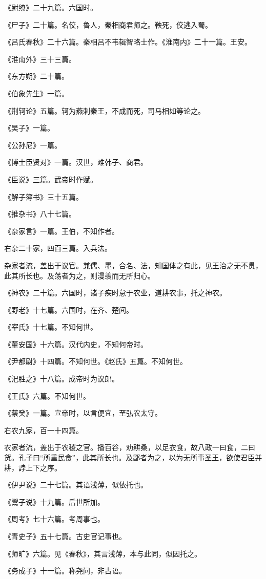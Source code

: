 \documentclass[]{article}
\begin{document}
《尉缭》二十九篇。六国时。

《尸子》二十篇。名佼，鲁人，秦相商君师之。鞅死，佼逃入蜀。

《吕氏春秋》二十六篇。秦相吕不韦辑智略士作。《淮南内》二十一篇。王安。

《淮南外》三十三篇。

《东方朔》二十篇。

《伯象先生》一篇。

《荆轲论》五篇。轲为燕刺秦王，不成而死，司马相如等论之。

《吴子》一篇。

《公孙尼》一篇。

《博士臣贤对》一篇。汉世，难韩子、商君。

《臣说》三篇。武帝时作赋。

《解子簿书》三十五篇。

《推杂书》八十七篇。

《杂家言》一篇。王伯，不知作者。

右杂二十家，四百三篇。入兵法。

杂家者流，盖出于议官。兼儒、墨，合名、法，知国体之有此，见王治之无不贯，此其所长也。及荡者为之，则漫羡而无所归心。

《神农》二十篇。六国时，诸子疾时怠于农业，道耕农事，托之神农。

《野老》十七篇。六国时，在齐、楚间。

《宰氏》十七篇。不知何世。

《董安国》十六篇。汉代内史，不知何帝时。

《尹都尉》十四篇。不知何世。《赵氏》五篇。不知何世。

《汜胜之》十八篇。成帝时为议郎。

《王氏》六篇。不知何世。

《蔡癸》一篇。宣帝时，以言便宜，至弘农太守。

右农九家，百一十四篇。

农家者流，盖出于农稷之官。播百谷，劝耕桑，以足衣食，故八政一曰食，二曰货。孔子曰``所重民食''，此其所长也。及鄙者为之，以为无所事圣王，欲使君臣并耕，誖上下之序。

《伊尹说》二十七篇。其语浅薄，似依托也。

《鬻子说》十九篇。后世所加。

《周考》七十六篇。考周事也。

《青史子》五十七篇。古史官记事也。

《师旷》六篇。见《春秋》，其言浅薄，本与此同，似因托之。

《务成子》十一篇。称尧问，非古语。
\end{document}
